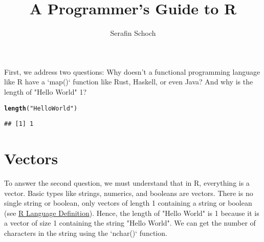 \documentclass[twoside,twocolumn]{article}\usepackage[]{graphicx}\usepackage[dvipsnames]{xcolor}
\title{ A Programmer's Guide to R}
\author{ Serafin Schoch }
\makeatletter
\newcommand{\hlstr}[1]{\textcolor[rgb]{0.192,0.494,0.8}{#1}}%
\newcommand{\hlstd}[1]{\textcolor[rgb]{0.345,0.345,0.345}{#1}}%
\newcommand{\hlkwd}[1]{\textcolor[rgb]{0.737,0.353,0.396}{\textbf{#1}}}%
\newenvironment{kframe}{%
 \def\at@end@of@kframe{}%
 \ifinner\ifhmode%
  \def\at@end@of@kframe{\end{minipage}}%
  \begin{minipage}{\columnwidth}%
 \fi\fi%
 \def\FrameCommand##1{\hskip\@totalleftmargin \hskip-\fboxsep
 \colorbox{shadecolor}{##1}\hskip-\fboxsep
     \hskip-\linewidth \hskip-\@totalleftmargin \hskip\columnwidth}%
 \MakeFramed {\advance\hsize-\width
   \@totalleftmargin\z@ \linewidth\hsize
   \@setminipage}}%
 {\par\unskip\endMakeFramed%
 \at@end@of@kframe}
\newenvironment{knitrout}{}{} %
\makeatother
\begin{document}
\maketitle
\thispagestyle{empty}



\label{sec:vectors}

First, we address two questions: Why doesn't a functional programming language like R have a `map()` function like Rust, Haskell, or even Java? And why is the length of "Hello World" 1?

\begin{knitrout}
\color{fgcolor}\begin{kframe}
\begin{alltt}
\hlkwd{length}\hlstd{(}\hlstr{"Hello World"}\hlstd{)}
\end{alltt}
\begin{verbatim}
## [1] 1
\end{verbatim}
\end{kframe}
\end{knitrout}

\section*{Vectors}

To answer the second question, we must understand that in R, everything is a vector. Basic types like strings, numerics, and booleans are vectors. There is no single string or boolean, only vectors of length 1 containing a string or boolean (see \href{https://cran.r-project.org/doc/manuals/r-release/R-lang.html#Vector-objects}{R Language Definition}). Hence, the length of "Hello World" is 1 because it is a vector of size 1 containing the string "Hello World". We can get the number of characters in the string using the `nchar()` function.
\end{document}
